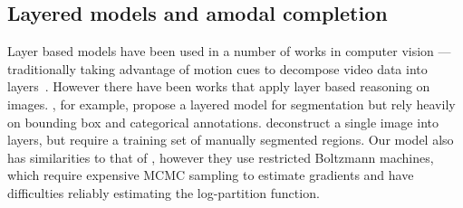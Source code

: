 \subsection{Layered models and amodal completion}
Layer based models have been used in a number of works in computer vision  --- traditionally
taking advantage of motion cues to decompose video data into layers~\cite{wang1994representing,ayer1995layered,kannan2005generative}.
However there have been works that apply layer based reasoning on images.
\cite{yang2012layered}, for example, propose a layered model for
segmentation but rely heavily on bounding box and categorical
annotations.	
\cite{Isola2013} deconstruct a single image into layers, but require a
training set of manually segmented regions.
Our model also has similarities to that of \cite{le2011learning}, however  they use restricted Boltzmann machines, 
which require expensive MCMC sampling to estimate gradients and have difficulties reliably estimating the 
log-partition function.  %
	
	
	


	
	
	
		
	
	
	
	
	
	
	
